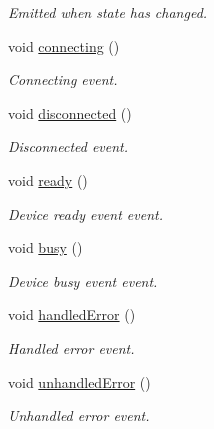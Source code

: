 \begin{DoxyCompactItemize}
\begin{DoxyCompactList}\small\item\em Emitted when state has changed. \end{DoxyCompactList}\item 
void \hyperlink{classmdt_port_manager_a6095719fbd3967428d48e7f57f23c56e}{connecting} ()
\begin{DoxyCompactList}\small\item\em Connecting event. \end{DoxyCompactList}\item 
void \hyperlink{classmdt_port_manager_ac6cfb9054c3b77689132dcf3a906eeb6}{disconnected} ()
\begin{DoxyCompactList}\small\item\em Disconnected event. \end{DoxyCompactList}\item 
void \hyperlink{classmdt_port_manager_afc4e88b2ade86ac13469bc0732c95f59}{ready} ()
\begin{DoxyCompactList}\small\item\em Device ready event event. \end{DoxyCompactList}\item 
void \hyperlink{classmdt_port_manager_a0936c65454409ffcf64ecb0632f6dbe3}{busy} ()
\begin{DoxyCompactList}\small\item\em Device busy event event. \end{DoxyCompactList}\item 
void \hyperlink{classmdt_port_manager_a30fac00920ab8d760df777f917183add}{handledError} ()
\begin{DoxyCompactList}\small\item\em Handled error event. \end{DoxyCompactList}\item 
void \hyperlink{classmdt_port_manager_a75111efb0c8956ddc98a87a9aedec695}{unhandledError} ()
\begin{DoxyCompactList}\small\item\em Unhandled error event. \end{DoxyCompactList}\end{DoxyCompactItemize}

